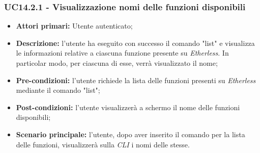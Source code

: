 \subsubsection{UC14.2.1 - Visualizzazione nomi delle funzioni disponibili}
\begin{itemize}
	\item \textbf{Attori primari:} Utente autenticato;
	\item \textbf{Descrizione:} l'utente ha eseguito con successo il comando "list" e visualizza le informazioni relative a ciascuna funzione presente su \textit{Etherless}. In particolar modo, per ciascuna di esse, verrà visualizzato il nome; 
	\item \textbf{Pre-condizioni:} l'utente richiede la lista delle funzioni presenti su \textit{Etherless} mediante il comando "list"; 
	\item \textbf{Post-condizioni:} l'utente visualizzerà a schermo il nome delle funzioni disponibili;
	\item \textbf{Scenario principale:} l'utente, dopo aver inserito il comando per la lista delle funzioni, visualizzerà sulla \textit{CLI\glo} i nomi delle stesse.
\end{itemize}